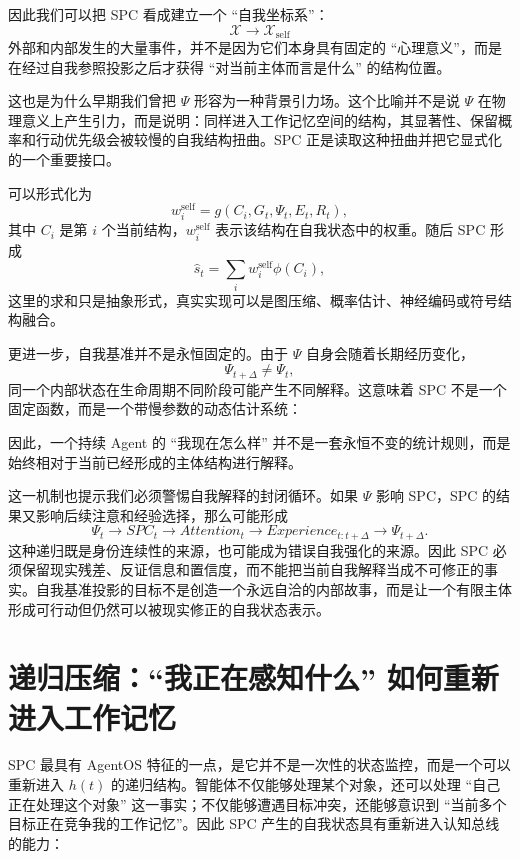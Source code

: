 因此我们可以把 SPC 看成建立一个 ``自我坐标系''：
\[
\boxed{
\mathcal X
\rightarrow
\mathcal X_{\mathrm{self}}
}
\]
外部和内部发生的大量事件，并不是因为它们本身具有固定的 ``心理意义''，而是在经过自我参照投影之后才获得 ``对当前主体而言是什么'' 的结构位置。

这也是为什么早期我们曾把 $\Psi$ 形容为一种背景引力场。这个比喻并不是说 $\Psi$ 在物理意义上产生引力，而是说明：同样进入工作记忆空间的结构，其显著性、保留概率和行动优先级会被较慢的自我结构扭曲。SPC 正是读取这种扭曲并把它显式化的一个重要接口。

可以形式化为
\[
w_i^{\mathrm{self}}
=
g(
C_i,
G_t,
\Psi_t,
E_t,
R_t
),
\]
其中 $C_i$ 是第 $i$ 个当前结构，$w_i^{\mathrm{self}}$ 表示该结构在自我状态中的权重。随后 SPC 形成
\[
\hat{s}_t
=
\sum_i
w_i^{\mathrm{self}}
\phi(C_i),
\]
这里的求和只是抽象形式，真实实现可以是图压缩、概率估计、神经编码或符号结构融合。

更进一步，自我基准并不是永恒固定的。由于 $\Psi$ 自身会随着长期经历变化，
\[
\Psi_{t+\Delta}
\neq
\Psi_t,
\]
同一个内部状态在生命周期不同阶段可能产生不同解释。这意味着 SPC 不是一个固定函数，而是一个带慢参数的动态估计系统：
\begin{statementbox}
\centering
{}
\end{statementbox}
因此，一个持续 Agent 的 ``我现在怎么样'' 并不是一套永恒不变的统计规则，而是始终相对于当前已经形成的主体结构进行解释。

这一机制也提示我们必须警惕自我解释的封闭循环。如果 $\Psi$ 影响 SPC，SPC 的结果又影响后续注意和经验选择，那么可能形成
\[
\Psi_t
\rightarrow
SPC_t
\rightarrow
Attention_t
\rightarrow
Experience_{t:t+\Delta}
\rightarrow
\Psi_{t+\Delta}.
\]
这种递归既是身份连续性的来源，也可能成为错误自我强化的来源。因此 SPC 必须保留现实残差、反证信息和置信度，而不能把当前自我解释当成不可修正的事实。自我基准投影的目标不是创造一个永远自洽的内部故事，而是让一个有限主体形成可行动但仍然可以被现实修正的自我状态表示。

\section{递归压缩：``我正在感知什么'' 如何重新进入工作记忆}

SPC 最具有 AgentOS 特征的一点，是它并不是一次性的状态监控，而是一个可以重新进入 $h(t)$ 的递归结构。智能体不仅能够处理某个对象，还可以处理 ``自己正在处理这个对象'' 这一事实；不仅能够遭遇目标冲突，还能够意识到 ``当前多个目标正在竞争我的工作记忆''。因此 SPC 产生的自我状态具有重新进入认知总线的能力：
\begin{statementbox}
\centering
{}
\end{statementbox}

